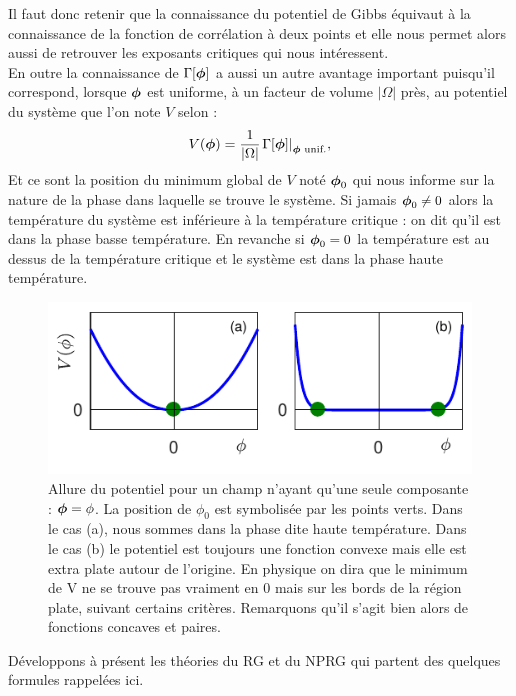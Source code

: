 \documentclass[10pt]{article}
\begin{document}
\begin{multicols}{2}
Il faut donc retenir que la connaissance du potentiel de Gibbs équivaut à la connaissance de la fonction de corrélation à deux points et elle nous permet alors aussi de retrouver les exposants critiques qui nous intéressent. \\

En outre la connaissance de $\Gamma[\boldsymbol{ \phi}]$ a aussi un autre avantage important puisqu'il correspond, lorsque $\boldsymbol{ \phi}$ est uniforme, à un facteur de volume $|\Omega|$ près, au potentiel du système que l'on note $V$ selon :
\begin{equation}
	V(\boldsymbol{ \phi}) = \frac{1}{|\Omega|}{\left. \Gamma[\boldsymbol{ \phi}] \right|}_{\boldsymbol{ \phi} \text{ unif.}},
\end{equation}
Et ce sont la position du minimum global de $V$ noté $\boldsymbol{ \phi}_0$ qui nous informe sur la nature de la phase dans laquelle se trouve le système. Si jamais $\boldsymbol{ \phi}_0 \neq 0$ alors la température du système est inférieure à la température critique : on dit qu'il est dans la phase basse température. En revanche si  $\boldsymbol{ \phi}_0 = 0$ la température est au dessus de la température critique et le système est dans la phase haute température.\\
\begin{figure}[H]
\begin{center}
\includegraphics[width=0.95\columnwidth]{CourbePot1.pdf}
\caption{Allure du potentiel pour un champ n'ayant qu'une seule composante : $\boldsymbol{ \phi} = \phi$. La position de $\phi_0$ est symbolisée par les points verts. Dans le cas (a), nous sommes dans la phase dite haute température. Dans le cas (b) le potentiel est toujours une fonction convexe mais elle est extra plate autour de l'origine. En physique on dira que le minimum de V ne se trouve pas vraiment en $0$ mais sur les bords de la région plate, suivant certains critères. Remarquons qu'il s'agit bien alors de fonctions concaves et paires.}
\end{center}
\end{figure}
\vspace*{-11pt}
Développons à présent les théories du RG et du NPRG qui partent des quelques formules rappelées ici. 




\end{multicols}
\end{document}
